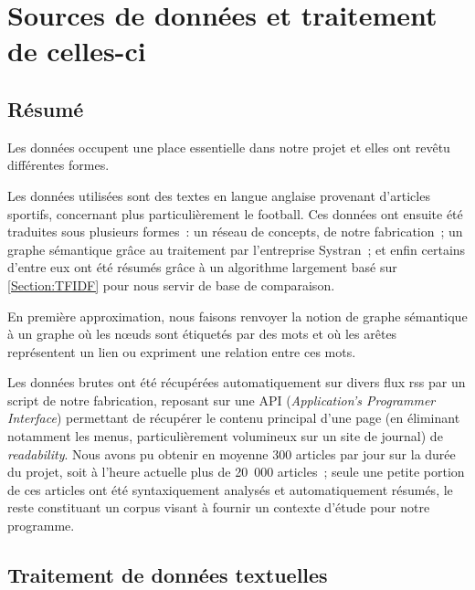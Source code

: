 \documentclass[a4paper, 12pt]{article}
\newcommand{\ang}[1]{\textit{#1}}%
\begin{document}


\section{Sources de données et traitement de celles-ci}\label{Section:sources}

\subsection{Résumé}

Les données occupent une place essentielle dans notre projet et elles ont revêtu différentes formes.

Les données utilisées sont des textes en langue anglaise provenant d'articles sportifs, concernant plus particulièrement le football. Ces données ont ensuite été traduites sous plusieurs formes~: un réseau de concepts, de notre fabrication~; un graphe sémantique grâce au traitement par l'entreprise Systran~; et enfin certains d'entre eux ont été résumés grâce à un algorithme largement basé sur \ref{Section:TFIDF} pour nous servir de base de comparaison.


\begin{definition}
En première approximation, nous faisons renvoyer la notion de graphe sémantique à un graphe où les nœuds sont étiquetés par des mots et où les arêtes représentent un lien ou expriment une relation entre ces mots.
\end{definition}

Les données brutes ont été récupérées automatiquement sur divers flux rss par un script de notre fabrication, reposant sur une API (\ang{Application's Programmer Interface}) permettant de récupérer le contenu principal d'une page (en éliminant notamment les menus, particulièrement volumineux sur un site de journal) de \ang{readability}. Nous avons pu obtenir en moyenne 300 articles par jour sur la durée du projet, soit à l'heure actuelle plus de 20~000 articles~; seule une petite portion de ces articles ont été syntaxiquement analysés et automatiquement résumés, le reste constituant un corpus visant à fournir un contexte d'étude pour notre programme.

\subsection{Traitement de données textuelles}
\end{document}
